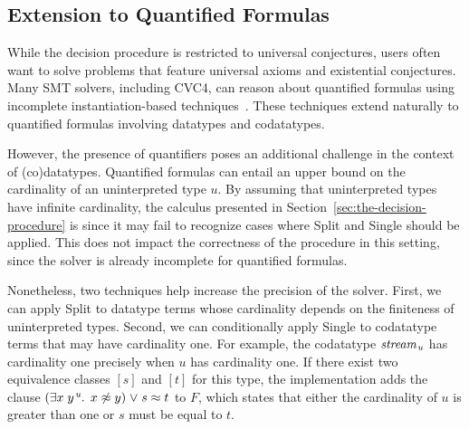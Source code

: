 \documentclass[smallcondensed,draft]{svjour3}
\newcommand\typ[1]{^{\vthinspace #1}}
\newcommand\ty[1]{\textit{#1}}
\newcommand{\Ec}{E}
\newcommand{\rn}[1]{\textsf{#1}}
\newcommand{\teq}{\approx}
\newcommand{\ec}[1]{[#1]}
\newcommand{\J}{\mathcalx{J}}
\newcommand{\ValC}{\smash{\mathcalx{A}^\star}}
\newcommand\vthinspace{\kern+0.083333em}
\begin{document}

\subsection{Extension to Quantified Formulas}

While the decision procedure is restricted to universal conjectures, users often
want to solve problems that feature universal axioms and existential
conjectures.
Many SMT solvers, including CVC4, can reason about quantified formulas using incomplete 
instantiation-based 
techniques~\cite{MouraBjoerner07,ReynoldsTinelliMoura14}.
These techniques extend naturally to quantified
formulas involving datatypes and codatatypes.

However, the presence of quantifiers poses an additional challenge in
the context of (co)datatypes. Quantified formulas can entail an upper bound on
the cardinality of an uninterpreted type $\ty{u}$.
By assuming that uninterpreted types have infinite cardinality, the calculus
presented in Section~\ref{sec:the-decision-procedure} is 
since it may fail to recognize cases where \rn{Split} and \rn{Single} should be
applied.
This does not %
impact the correctness of the procedure in this setting,
since %
the solver is already incomplete for quantified formulas.

Nonetheless, two techniques help increase the precision of the solver.
First, we can apply \rn{Split} to datatype terms whose cardinality depends on the finiteness of
uninterpreted types.
Second, we can conditionally apply \rn{Single} to codatatype terms that may have cardinality one.
For example, the codatatype $\ty{stream}_{\vthinspace\ty{u}}$ %
has cardinality one precisely when $\ty{u}$ has cardinality one.
If there exist two equivalence classes $\ec{s}$ and $\ec{t}$ for this type,
the implementation adds the clause %
$(\exists x\;y\typ{\ty{u}}.\;\, x \not\teq y ) \mathrel\vee s \teq t$ to $F\!$,
which states that either the cardinality of $\ty{u}$ is greater than one or
$s$ must be equal to $t$.

\end{document}

